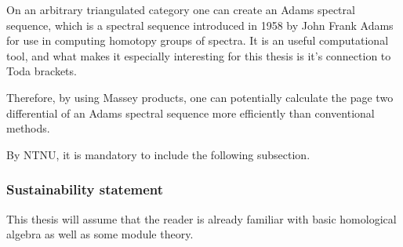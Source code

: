 On an arbitrary triangulated category one can create an Adams spectral sequence, which is a spectral sequence introduced in 1958 by John Frank Adams for use in computing homotopy groups of spectra. It is an useful computational tool, and what makes it especially interesting for this thesis is it's connection to Toda brackets.

Therefore, by using Massey products, one can potentially calculate the page two differential of an Adams spectral sequence more efficiently than conventional methods.


By NTNU, it is mandatory to include the following subsection.
\subsubsection{Sustainability statement}


This thesis will assume that the reader is already familiar with basic homological algebra as well as some module theory.
